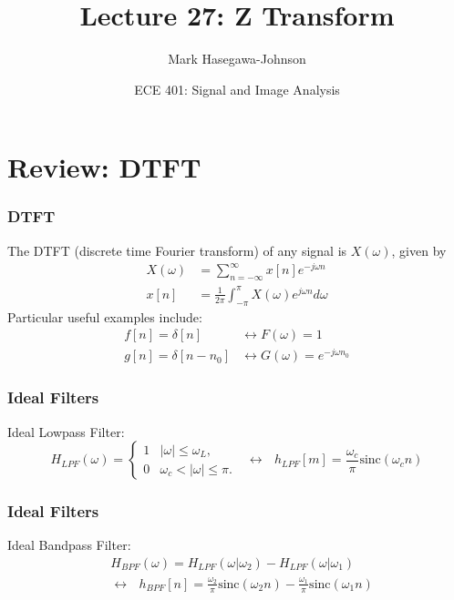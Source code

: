 \documentclass{beamer}
\title{Lecture 27: Z Transform}
\author{Mark Hasegawa-Johnson}
\date{ECE 401: Signal and Image Analysis}
\begin{document}
\begin{frame}
  \maketitle
\end{frame}

\begin{frame}
  \tableofcontents
\end{frame}

\section[DTFT]{Review: DTFT}
\setcounter{subsection}{1}

\begin{frame}
  \frametitle{DTFT}

  The DTFT (discrete time Fourier transform) of any signal is
  $X(\omega)$, given by
  \begin{align*}
    X(\omega) &= \sum_{n=-\infty}^\infty x[n]e^{-j\omega n}\\
    x[n] &= \frac{1}{2\pi}\int_{-\pi}^\pi X(\omega)e^{j\omega n}d\omega
  \end{align*}
  Particular useful examples include:
  \begin{align*}
    f[n]=\delta[n] &\leftrightarrow F(\omega)=1\\
    g[n]=\delta[n-n_0] &\leftrightarrow G(\omega)=e^{-j\omega n_0}
  \end{align*}
\end{frame}

\begin{frame}
  \frametitle{Ideal Filters}
  Ideal Lowpass Filter:
  \[
  H_{LPF}(\omega)
  = \begin{cases} 1& |\omega|\le\omega_L,\\
    0 & \omega_c<|\omega|\le\pi.
  \end{cases}~~~\leftrightarrow~~~
  h_{LPF}[m]=\frac{\omega_c}{\pi}\mbox{sinc}(\omega_c n)
  \]
\end{frame}

\begin{frame}
  \frametitle{Ideal Filters}
  Ideal Bandpass Filter:
  \begin{align*}
    &H_{BPF}(\omega)=H_{LPF}(\omega|\omega_2)-H_{LPF}(\omega|\omega_1)\\
    &\leftrightarrow~~~ h_{BPF}[n]=\frac{\omega_2}{\pi}\mbox{sinc}(\omega_2 n)-
    \frac{\omega_1}{\pi}\mbox{sinc}(\omega_1 n)
  \end{align*}
\end{frame}
\end{document}
